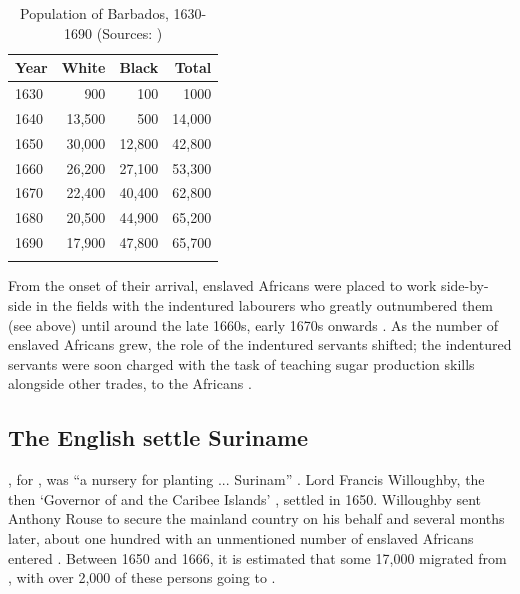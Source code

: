 \begin{table}
\begin{tabular}{lrrr}
\lsptoprule 
{Year} & {White} & {Black} & {Total}\\
\midrule
1630 & 900 & 100 & 1000 \\
1640 & 13,500 & 500 & 14,000 \\
1650 & 30,000 & 12,800 & 42,800 \\
1660 & 26,200 & 27,100 & 53,300 \\
1670 & 22,400 & 40,400 & 62,800 \\
1680 & 20,500 & 44,900 & 65,200 \\
1690 & 17,900 & 47,800 & 65,700 \\
\lspbottomrule 
\end{tabular}
\caption{Population of Barbados, 1630-1690 (Sources: \citealt{Campbell77, Campbell84, McCusker91})\label{Table 6.1}}
\end{table}


From the onset of their arrival, enslaved Africans were placed to work side-by-side in the fields with the indentured labourers who greatly outnumbered them (see  above) until around the late 1660s, early 1670s onwards \citep{Davies74, Blackburn98, Galenson02, Elliott07, Bannet11}. As the number of enslaved Africans grew, the role of the  indentured servants shifted; the indentured servants were soon charged with the task of teaching sugar production skills alongside other trades, to the Africans \citep{Galenson02}.

\subsection{The English settle Suriname}\label{6.1.3}
, for , was ``a nursery for planting ... Surinam'' \citep{Sainsbury80}. Lord Francis Willoughby, the then `Governor of  and the Caribee Islands' \citep{Hotton74}, settled  in 1650. Willoughby sent Anthony Rouse to secure the mainland country on his behalf and several months later, about one hundred  with an unmentioned number of enslaved Africans entered  \citep{Kambel99}. Between 1650 and 1666, it is estimated that some 17,000  migrated from  \citep{Hornsby05}, with over 2,000 of these persons going to  \citep{Campbell86}.

